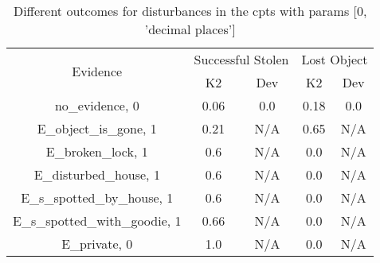 \begin{table}\begin{tabular}{c|cc|cc}\toprule\multirow{2}{*}{Evidence} & \multicolumn{2}{c}{Successful Stolen} & \multicolumn{2}{c}{Lost Object} \\& {K2} & {Dev} & {K2} & {Dev} \\\midrule
no\_evidence, 0 & \cellcolor{Bittersweet}0.06&\cellcolor{Bittersweet}0.0&\cellcolor{Bittersweet}0.18&\cellcolor{Bittersweet}0.0\\E\_object\_is\_gone, 1 & \cellcolor{Bittersweet}0.21&\cellcolor{Bittersweet}N/A&\cellcolor{Bittersweet}0.65&\cellcolor{Bittersweet}N/A\\E\_broken\_lock, 1 & \cellcolor{Bittersweet}0.6&\cellcolor{Bittersweet}N/A&\cellcolor{Bittersweet}0.0&\cellcolor{Bittersweet}N/A\\E\_disturbed\_house, 1 & \cellcolor{Bittersweet}0.6&\cellcolor{Bittersweet}N/A&\cellcolor{Bittersweet}0.0&\cellcolor{Bittersweet}N/A\\E\_s\_spotted\_by\_house, 1 & \cellcolor{Bittersweet}0.6&\cellcolor{Bittersweet}N/A&\cellcolor{Bittersweet}0.0&\cellcolor{Bittersweet}N/A\\E\_s\_spotted\_with\_goodie, 1 & \cellcolor{Bittersweet}0.66&\cellcolor{Bittersweet}N/A&\cellcolor{Bittersweet}0.0&\cellcolor{Bittersweet}N/A\\E\_private, 0 & \cellcolor{Bittersweet}1.0&\cellcolor{Bittersweet}N/A&\cellcolor{Bittersweet}0.0&\cellcolor{Bittersweet}N/A\\\bottomrule\end{tabular}\caption{Different outcomes for disturbances in the cpts with params [0, 'decimal places']}\end{table}